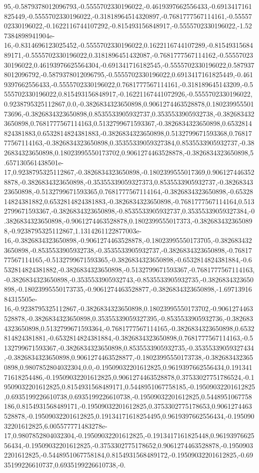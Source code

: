 95,-0.5879378012096793,-0.5555702330196022,-0.4619397662556433,-0.6913417161825449,-0.5555702330196022,-0.31818964514320897,-0.7681777567114161,-0.5555702330196022,-0.1622116744107292,-0.815493156848917,-0.5555702330196022,-1.527384898941904e-16,-0.8314696123025452,-0.5555702330196022,0.1622116744107289,-0.8154931568489171,-0.5555702330196022,0.3181896451432087,-0.7681777567114162,-0.5555702330196022,0.46193976625564304,-0.691341716182545,-0.5555702330196022,0.5879378012096792,-0.5879378012096795,-0.5555702330196022,0.6913417161825449,-0.4619397662556433,-0.5555702330196022,0.7681777567114161,-0.318189645143209,-0.5555702330196022,0.815493156848917,-0.16221167441072926,-0.5555702330196022,0.9238795325112867,0.0,-0.3826834323650898,0.9061274463528878,0.18023995550173696,-0.3826834323650898,0.8535533905932737,0.3535533905932738,-0.3826834323650898,0.7681777567114163,0.5132799671593367,-0.3826834323650898,0.6532814824381883,0.6532814824381883,-0.3826834323650898,0.5132799671593368,0.7681777567114163,-0.3826834323650898,0.35355339059327384,0.8535533905932737,-0.3826834323650898,0.18023995550173702,0.9061274463528878,-0.3826834323650898,5.657130561438501e-17,0.9238795325112867,-0.3826834323650898,-0.1802399555017369,0.9061274463528878,-0.3826834323650898,-0.35355339059327373,0.8535533905932737,-0.3826834323650898,-0.5132799671593365,0.7681777567114164,-0.3826834323650898,-0.6532814824381882,0.6532814824381883,-0.3826834323650898,-0.7681777567114164,0.5132799671593367,-0.3826834323650898,-0.8535533905932737,0.35355339059327384,-0.3826834323650898,-0.9061274463528878,0.1802399555017373,-0.3826834323650898,-0.9238795325112867,1.1314261122877003e-16,-0.3826834323650898,-0.9061274463528878,-0.18023995550173705,-0.3826834323650898,-0.8535533905932738,-0.3535533905932737,-0.3826834323650898,-0.7681777567114165,-0.5132799671593365,-0.3826834323650898,-0.6532814824381884,-0.6532814824381882,-0.3826834323650898,-0.5132799671593367,-0.7681777567114163,-0.3826834323650898,-0.3535533905932743,-0.8535533905932735,-0.3826834323650898,-0.18023995550173735,-0.9061274463528877,-0.3826834323650898,-1.6971391684315505e-16,-0.9238795325112867,-0.3826834323650898,0.18023995550173702,-0.9061274463528878,-0.3826834323650898,0.35355339059327395,-0.8535533905932736,-0.3826834323650898,0.5132799671593364,-0.7681777567114165,-0.3826834323650898,0.6532814824381881,-0.6532814824381884,-0.3826834323650898,0.7681777567114163,-0.5132799671593367,-0.3826834323650898,0.8535533905932735,-0.35355339059327434,-0.3826834323650898,0.9061274463528877,-0.18023995550173738,-0.3826834323650898,0.9807852804032304,0.0,-0.19509032201612825,0.9619397662556434,0.19134171618254486,-0.19509032201612825,0.9061274463528878,0.37533027751786524,-0.19509032201612825,0.8154931568489171,0.5448951067758185,-0.19509032201612825,0.6935199226610738,0.6935199226610738,-0.19509032201612825,0.5448951067758186,0.8154931568489171,-0.19509032201612825,0.3753302775178653,0.9061274463528878,-0.19509032201612825,0.19134171618254495,0.9619397662556434,-0.19509032201612825,6.005577771483278e-17,0.9807852804032304,-0.19509032201612825,-0.1913417161825448,0.9619397662556434,-0.19509032201612825,-0.3753302775178652,0.9061274463528878,-0.19509032201612825,-0.5448951067758184,0.8154931568489172,-0.19509032201612825,-0.6935199226610737,0.6935199226610738,-0.